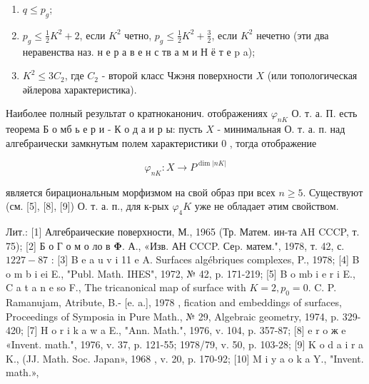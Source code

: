\documentclass[10pt]{article}
\begin{document}
\begin{enumerate}

  \item $q \leqslant p_{g}$;



  \item $p_{g} \leqslant \frac{1}{2} K^{2}+2$, если $K^{2}$ четно, $p_{g} \leqslant \frac{1}{2} K^{2}+\frac{3}{2}$, если $K^{2}$ нечетно (эти два неравенства наз. н е р а в е н с тв а м и Н ё т е p a);



  \item $K^{2} \leqslant 3 C_{2}$, где $C_{2}$ - второй класс Чжэня поверхности $X$ (или топологическая әйлерова характеристика).



\end{enumerate}



Наиболее полный результат о кратноканонич. отображениях $\varphi_{n K}$ О. т. а. П. есть теорема Б о мб ь е р и - К о д а и р ы: пусть $X$ - минимальная О. т. а. п. над алгебраически замкнутым полем характеристики 0 , тогда отображение



\[

\varphi_{n K}: X \longrightarrow P^{\operatorname{dim}|n K|}

\]



является бирациональным морфизмом на свой образ при всех $n \geqslant 5$. Существуют (см. [5], [8], [9]) О. т. а. п., для к-рых $\varphi_{4} K$ уже не обладает әтим свойством.



Лит.: [1] Алгебраические поверхности, М., 1965 (Тр. Матем. ин-та AH CCCP, т. 75); [2] Б о Г о м о ло в $\boldsymbol{\Phi}$. А., «Изв. АН CCCP. Сеp. матем.", 1978, т. 42, с. $1227-87$ : [3] B e a u v i 11 e A. Surfaces algébriques complexes, P., 1978; [4] B o m b i ei E., "Publ. Math. IHES", 1972, № 42, p. 171-219; [5] B o mb i e r i E., C a t a n e so F., The tricanonical map of surface with $K=2, p_{0}=0$. C. P. Ramanujam, Atribute, B.- [e. a.], 1978 , fication and embeddings of surfaces, Proceedings of Symposia in Pure Math., № 29, Algebraic geometry, 1974, p. 329-420; [7] H o r i k a w a E., "Ann. Math.", 1976, v. 104, p. 357-87; [8] e r o ж e «Invent. math.", 1976, v. 37, p. 121-55; 1978/79, v. 50, p. 103-28; [9] K o d a i r a K., (JJ. Math. Soc. Japan», 1968 , v. 20, p. 170-92; [10] M i y a o k a Y., "Invent. math.»,
\end{document}
